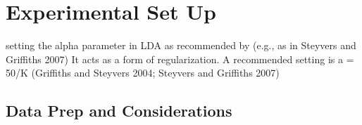 
\chapter{Experimental Set Up} %

\label{Chapter3} %

setting the alpha parameter in LDA as recommended by (e.g., as in Steyvers and Griffiths 2007) It acts as a form of regularization.
A recommended setting is a = 50/K (Griffiths and Steyvers 2004; Steyvers and Griffiths 2007)
\section{Data Prep and Considerations}



